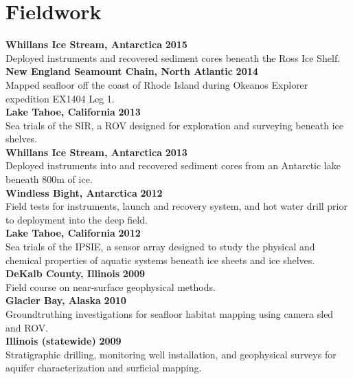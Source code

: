 \section{Fieldwork} 

\textbf{Whillans Ice Stream, Antarctica} \hfill \textbf{2015}\\
Deployed instruments and recovered sediment cores beneath the Ross Ice Shelf. \\

\textbf{New England Seamount Chain, North Atlantic} \hfill \textbf{2014}\\
Mapped seafloor off the coast of Rhode Island during Okeanos Explorer expedition EX1404 Leg 1. \\

\textbf{Lake Tahoe, California} \hfill \textbf{2013}\\
Sea trials of the SIR, a ROV designed for exploration and surveying beneath ice shelves.\\

\textbf{Whillans Ice Stream, Antarctica} \hfill \textbf{2013}\\
Deployed instruments into and recovered sediment cores from an Antarctic lake beneath 800m of ice.\\

\textbf{Windless Bight, Antarctica} \hfill \textbf{2012}\\
Field tests for instruments, launch and recovery system, and hot water drill prior to deployment into the deep field.\\

 \textbf{Lake Tahoe, California} \hfill \textbf{2012}\\
Sea trials of the IPSIE, a sensor array designed to study the physical and chemical properties of aquatic systems beneath ice sheets and ice shelves.\\

\textbf{DeKalb County, Illinois} \hfill \textbf{2009}\\
Field course on near-surface geophysical methods.\\

\textbf{Glacier Bay, Alaska} \hfill \textbf{2010}\\
Groundtruthing investigations for seafloor habitat mapping using camera sled and ROV.\\

\textbf{Illinois (statewide)} \hfill \textbf{2009}\\
Stratigraphic drilling, monitoring well installation, and geophysical surveys for aquifer characterization and surficial mapping. \\
